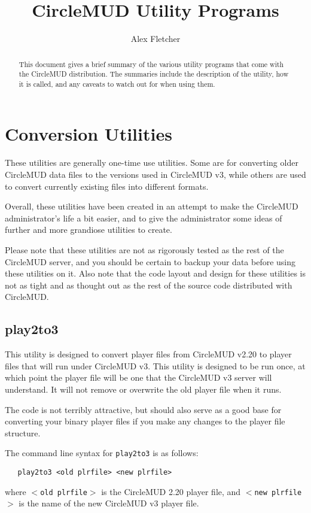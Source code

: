 \documentclass[11pt]{article}
\title{CircleMUD Utility Programs}
\author{Alex Fletcher}
\begin{document}
\maketitle

\begin{abstract}
This document gives a brief summary of the various utility programs that come with the CircleMUD distribution.  The summaries include the description of the utility, how it is called, and any caveats to watch out for when using them.
\end{abstract}

\tableofcontents

\section{Conversion Utilities}
These utilities are generally one-time use utilities.  Some are for converting older CircleMUD data files to the versions used in CircleMUD v3, while others are used to convert currently existing files into different formats.
\par
Overall, these utilities have been created in an attempt to make the CircleMUD administrator's life a bit easier, and to give the administrator some ideas of further and more grandiose utilities to create.
\par
Please note that these utilities are not as rigorously tested as the rest of the CircleMUD server, and you should be certain to backup your data before using these utilities on it.  Also note that the code layout and design for these utilities is not as tight and as thought out as the rest of the source code distributed with CircleMUD.

\subsection{play2to3}
This utility is designed to convert player files from CircleMUD v2.20 to player files that will run under CircleMUD v3.  This utility is designed to be run once, at which point the player file will be one that the CircleMUD v3 server will understand.  It will not remove or overwrite the old player file when it runs.
\par
The code is not terribly attractive, but should also serve as a good base for converting your binary player files if you make any changes to the player file structure.
\par
The command line syntax for \texttt{play2to3} is as follows:
\begin{verbatim}
   play2to3 <old plrfile> <new plrfile>
\end{verbatim}
where \texttt{$<$old plrfile$>$} is the CircleMUD 2.20 player file, and \texttt{$<$new plrfile$>$} is the name of the new CircleMUD v3 player file.
\end{document}
